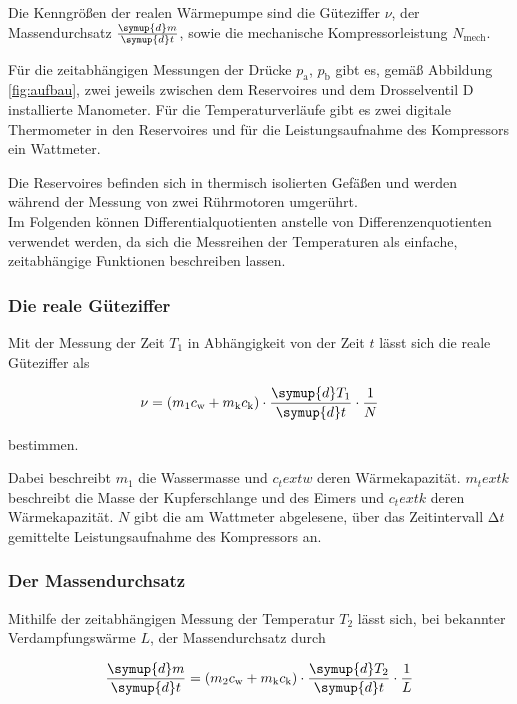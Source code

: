 Die Kenngrößen der realen Wärmepumpe sind die Güteziffer $\nu$, der 
Massendurchsatz $\frac{\symup{d}m}{\symup{d}t}$, sowie die mechanische 
Kompressorleistung $N_\text{mech}$.

Für die zeitabhängigen Messungen der Drücke $p_\text{a}$, $p_\text{b}$ 
gibt es, gemäß Abbildung \ref{fig:aufbau}, zwei jeweils zwischen dem Reservoires und dem 
Drosselventil D installierte Manometer. Für die Temperaturverläufe gibt es 
zwei digitale Thermometer in den Reservoires und für die Leistungsaufnahme
des Kompressors ein Wattmeter.

Die Reservoires befinden sich in thermisch isolierten Gefäßen und werden während
der Messung von zwei Rührmotoren umgerührt. \\

Im Folgenden können Differentialquotienten anstelle von Differenzenquotienten 
verwendet werden, da sich die Messreihen der Temperaturen als einfache, zeitabhängige
Funktionen beschreiben lassen.

\subsubsection{Die reale Güteziffer}


Mit der Messung der Zeit $T_1$ in Abhängigkeit von der Zeit $t$ lässt sich die
reale Güteziffer als

\begin{equation}
\nu = (m_1 c_\text{w} + m_\text{k} c_\text{k})\cdot 
\frac{\symup{d} T_1}{\symup{d} t} \cdot \frac{1}{N}
\label{eqn:Güteziffer}
\end{equation}

bestimmen. 

Dabei beschreibt $m_1$ die Wassermasse und $c_text{w}$ deren 
Wärmekapazität. $m_text{k}$ beschreibt die Masse der Kupferschlange und 
des Eimers und $c_text{k}$ deren Wärmekapazität.
$N$ gibt die am Wattmeter abgelesene, über das Zeitintervall $\increment t$
gemittelte Leistungsaufnahme des Kompressors an.

\subsubsection{Der Massendurchsatz}

Mithilfe der zeitabhängigen Messung der Temperatur $T_2$ lässt sich, bei 
bekannter Verdampfungswärme $L$, der Massendurchsatz durch

\begin{equation}
\frac{\symup{d} m}{\symup{d}t} = (m_2 c_\text{w} + m_\text{k} c_\text{k}) \cdot 
\frac{\symup{d} T_2}{\symup{d}t} \cdot  \frac{1}{L}
\label{eqn:Massendurchsatz}
\end{equation}

